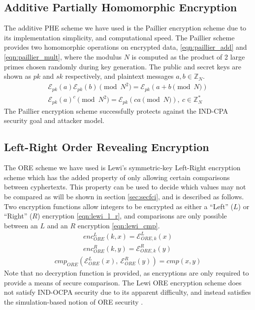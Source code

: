 \documentclass[letterpaper, 10 pt, conference]{ieeeconf}  %
\begin{document}
\subsection{Additive Partially Homomorphic Encryption} \label{subsec:paillier}
The additive PHE scheme we have used is the Paillier encryption scheme \cite{paillierPublicKeyCryptosystemsBased1999} due to its implementation simplicity, and computational speed. The Paillier scheme provides two homomorphic operations on encrypted data, \eqref{eqn:paillier_add} and \eqref{eqn:paillier_mult}, where the modulus $N$ is computed as the product of 2 large primes chosen randomly during key generation. The public and secret keys are shown as $pk$ and $sk$ respectively, and plaintext messages $a,b \in \mathbb{Z}_N$.
\begin{gather}
   \mathcal{E}_{pk}(a)\mathcal{E}_{pk}(b) \pmod{N^{2}} = \mathcal{E}_{pk}(a + b \pmod{N}) \label{eqn:paillier_add}\\
   \mathcal{E}_{pk}(a)^c \pmod{N^{2}} = \mathcal{E}_{pk}(ca \pmod{N}),\ c \in \mathbb{Z}^*_N \label{eqn:paillier_mult}
\end{gather}
The Paillier encryption scheme successfully protects against the IND-CPA security goal and attacker model.

\subsection{Left-Right Order Revealing Encryption} \label{subsec:lewi}
The ORE scheme we have used is Lewi's symmetric-key Left-Right encryption scheme \cite{lewiOrderRevealingEncryptionNew2016} which has the added property of only allowing certain comparisons between cyphertexts. This property can be used to decide which values may not be compared as will be shown in section \ref{sec:secfci}, and is described as follows. Two encryption functions allow integers to be encrypted as either a ``Left'' ($L$) or ``Right'' ($R$) encryption \eqref{eqn:lewi_l_r}, and comparisons are only possible between an $L$ and an $R$ encryption \eqref{eqn:lewi_cmp}.
\begin{equation}
   \begin{gathered} \label{eqn:lewi_l_r}
      enc^L_{ORE}(k, x) = \mathcal{E}^L_{ORE,k}(x) \\
      enc^R_{ORE}(k, y) = \mathcal{E}^R_{ORE,k}(y)
   \end{gathered}
\end{equation}
\begin{gather}
   cmp_{ORE}(\mathcal{E}^L_{ORE}(x),\ \mathcal{E}^R_{ORE}(y)) = cmp(x, y) \label{eqn:lewi_cmp}
\end{gather}
Note that no decryption function is provided, as encryptions are only required to provide a means of secure comparison. The Lewi ORE encryption scheme does not satisfy IND-OCPA security due to its apparent difficulty, and instead satisfies the simulation-based notion of ORE security \cite{lewiOrderRevealingEncryptionNew2016,chenettePracticalOrderRevealingEncryption2016}.
\end{document}
